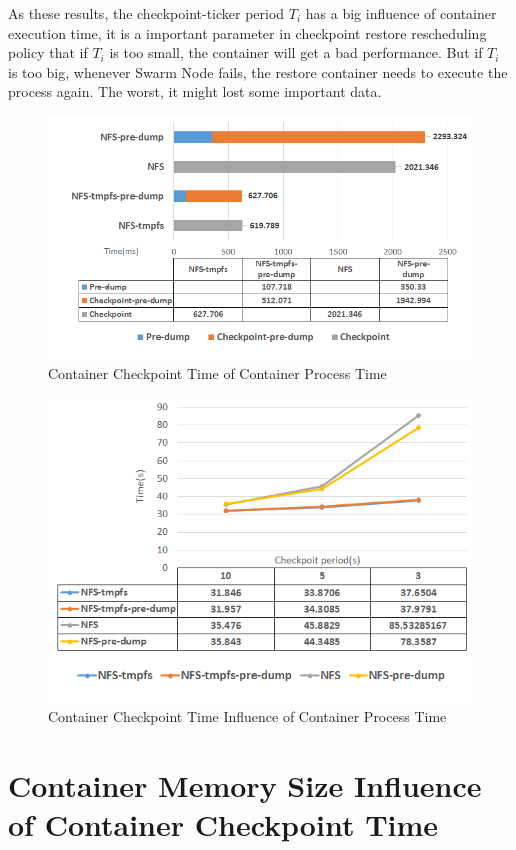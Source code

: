 As these results, the checkpoint-ticker period $ T_i $ has a big influence of container execution time, it is a important parameter in checkpoint restore rescheduling policy that if $ T_i $ is too small, the container will get a bad performance. But if $ T_i $ is too big, whenever Swarm Node fails, the restore container needs to execute the process again. The worst, it might lost some important data.

\begin{figure}[h]
\begin{center}
\includegraphics[width=14cm]{figure/cpu_checkpoint_time.png}
\end{center}
\caption{Container Checkpoint Time of Container Process Time}
\label{fig:Checkpoint Time CPU}
\end{figure}

\begin{figure}[h]
\begin{center}
\includegraphics[width=14cm]{figure/cpu_checkpoint_period.png}
\end{center}
\caption{Container Checkpoint Time Influence of Container Process Time}
\label{fig:Checkpoint Time Influence CPU}
\end{figure}

\section{Container Memory Size Influence of Container Checkpoint Time}

